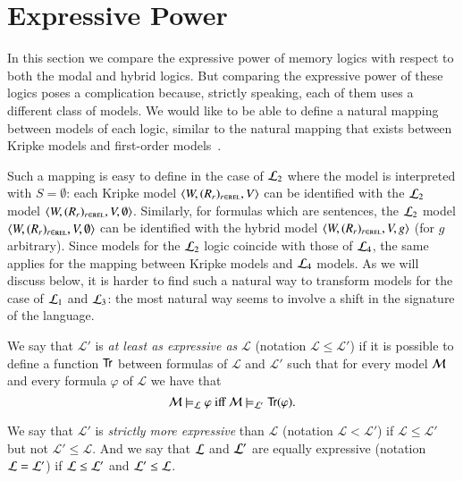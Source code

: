 \section{Expressive Power}\label{expressivity}

In this section we compare the expressive power of memory logics
with respect to both the modal and hybrid logics.
But comparing the expressive power of these logics poses a complication
because, strictly speaking, each of them uses a different class of models.
We would like to be able to define a natural mapping between models
of each logic, similar to the natural mapping that exists between
Kripke models and first-order models~\cite{BRV01}.

Such a mapping is easy to define in the case of $\mathcal{L}_2$ where the model is interpreted with $S=\emptyset$: each
Kripke model $\langle W,(R_r)_{r \in \textsc{rel}},V \rangle$ can be identified with the $\mathcal{L}_2$
model $\langle W,(R_r)_{r \in \textsc{rel}}, V, \emptyset \rangle$. Similarly, for formulas
which are sentences, the $\mathcal{L}_2$ model $\langle W,(R_r)_{r \in \textsc{rel}},V,\emptyset \rangle$ can be identified with the hybrid model
$\langle W,(R_r)_{r \in \textsc{rel}},V,g \rangle$ (for $g$ arbitrary).
%
Since models for the $\mathcal{L}_2$ logic coincide with those of
$\mathcal{L}_4$, the same applies for the mapping between Kripke models
and $\mathcal{L}_4$ models.
%
As we will discuss below, it is harder to find such a natural way to
transform models for the case of $\mathcal{L}_1$ and $\mathcal{L}_3$: the most
natural way seems to involve a shift in the signature of the
language.

\begin{defn}
We say that
$\mathcal{L'}$ is \emph{at least as expressive as} $\mathcal{L}$
(notation $\mathcal{L} \le \mathcal{L'}$) if it is possible to
define a function ${\sf Tr}$ between formulas of  $\mathcal{L}$ and $\mathcal{L'}$
such that for every model $\mathcal{M}$ and every formula $\varphi$ of $\mathcal{L}$
we have that
\[
\mathcal{M} \models_\mathcal{L} \varphi \mbox{ iff } \mathcal{M} \models_{\mathcal{L}'} {\sf Tr}(\varphi).
\]

We say that $\mathcal{L'}$ is \emph{strictly more expressive} than $\mathcal{L}$
(notation $\mathcal{L} < \mathcal{L'}$) if $\mathcal{L} \le \mathcal{L'}$ but
not $\mathcal{L}' \le \mathcal{L}$.  And we say that $\mathcal{L}$ and $\mathcal{L}'$ are equally
expressive (notation $\mathcal{L} = \mathcal{L}'$) if $\mathcal{L} \le \mathcal{L}'$ and $\mathcal{L}' \le \mathcal{L}$.
\end{defn}


